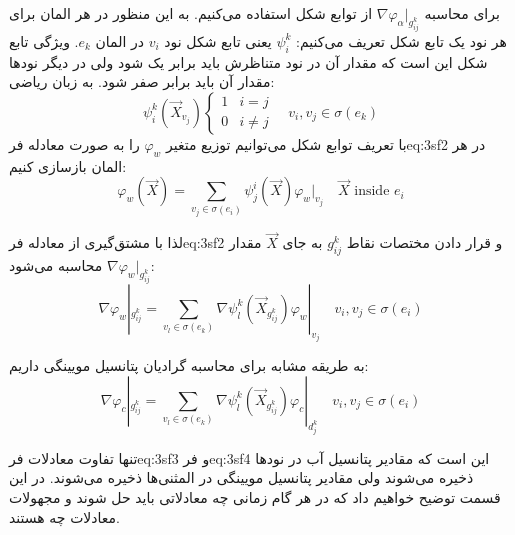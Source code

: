 برای محاسبه  $\nabla\varphi_\alpha|_{g_{ij}^k}$  از توابع شکل استفاده می‌کنیم. به این منظور در هر المان برای هر نود یک تابع شکل تعریف می‌کنیم: $\psi_i^k$ یعنی تابع شکل نود $v_i$ در المان $e_k$. ویژگی تابع شکل 
این است که مقدار آن در نود متناظرش باید برابر یک شود ولی در دیگر نود‌ها مقدار آن باید برابر صفر شود. به زبان ریاضی:
\begin{equation}
\label{eq:sf1}
\psi_i^k (\vec{X}_{v_j}) 
\begin{cases}
1	&i=j \\
0	&i\neq j
\end{cases}
\quad v_i,v_j \in \sigma (e_k)
\end{equation}
با تعریف توابع شکل می‌توانیم توزیع متغیر $\varphi_w$ را به صورت معادله ‌فر{eq:3sf2} در هر المان باز‌سازی کنیم:
\begin{equation}
\label{eq:3sf2}
\varphi_w(\vec X) = \sum_{v_j \in \sigma(e_i)} \psi_j^i(\vec X) \varphi_w|_{v_j}
\quad \vec{X} \text{  inside  }  e_i
\end{equation}

لذا با مشتق‌گیری از معادله  ‌فر{eq:3sf2} و قرار دادن مختصات نقاط $g_{ij}^k$ به جای $\vec X$ مقدار $\nabla\varphi_w|_{g_{ij}^k}$ محاسبه می‌شود:
\begin{equation}
\label{eq:3sf3}
\nabla \varphi_w|_{g_{ij}^k} = \sum_{v_l \in \sigma(e_k)} \nabla \psi_l^k(\vec X_{g_{ij}^k}) \varphi_w|_{v_j}
\quad  v_i,v_j \in  \sigma(e_i)
\end{equation} 

به طریقه مشابه برای محاسبه گرادیان پتانسیل مویینگی داریم:
\begin{equation}
\label{eq:3sf4}
\nabla \varphi_c|_{g_{ij}^k} = \sum_{v_l \in \sigma(e_k)} \nabla \psi_l^k(\vec X_{g_{ij}^k}) \varphi_c|_{d_j^k}
\quad  v_i,v_j \in  \sigma(e_i)
\end{equation} 

تنها تفاوت معادلات  ‌فر{eq:3sf3} و  ‌فر{eq:3sf4} این است که مقادیر پتانسیل آب در نود‌ها ذخیره می‌شوند ولی مقادیر پتانسیل مویینگی در المثنی‌ها ذخیره می‌شوند.
در این قسمت توضیح خواهیم داد که در هر گام زمانی چه معادلاتی باید حل شوند و مجهولات معادلات چه هستند.

